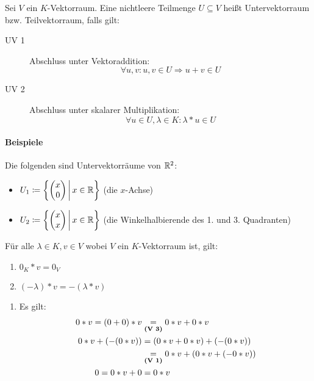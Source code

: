Sei $V$ ein $K$-Vektorraum. Eine nichtleere Teilmenge $U\subseteq V$ heißt Untervektorraum bzw. Teilvektorraum, falls gilt:
\begin{description}
  \item[UV 1] Abschluss unter Vektoraddition:
  \begin{equation*}
    \forall u,v : u,v \in U \Rightarrow u+v\in U
  \end{equation*}
  \item[UV 2] Abschluss unter skalarer Multiplikation:
  \begin{equation*}
    \forall u\in U, \lambda\in K : \lambda* u \in U
  \end{equation*}
\end{description}

\paragraph{Beispiele}
Die folgenden sind Untervektorräume von $\mathbb{R}^2$:
\begin{itemize}
  \item $U_1\coloneqq \left\{ \begin{pmatrix}x\\0\end{pmatrix} \,\middle|\, x\in\mathbb{R} \right\}$ (die $x$-Achse)
  \item $U_2\coloneqq \left\{ \begin{pmatrix}x\\x\end{pmatrix} \,\middle|\, x\in\mathbb{R} \right\}$ (die Winkelhalbierende des 1. und 3. Quadranten)
\end{itemize}


\begin{lemma}{}
  Für alle $\lambda \in K, v\in V$ wobei $V$ ein $K$-Vektorraum ist, gilt:
  \begin{enumerate}
    \item $0_K* v = 0_V$
    \item $(-\lambda)* v = -(\lambda* v)$
  \end{enumerate}
\end{lemma}
\beweis
\begin{enumerate}
  \item Es gilt:
  \begin{align*}
    0* v = (0+0)* v &\underset{\text{\textbf{(V 3)}}}{=}0* v+ 0* v\\
    0* v + (-(0* v)) &=(0* v + 0* v)+(-(0*v))\\
    &\underset{\text{\textbf{(V 1)}}}{=} 0*v+(0*v+(-0*v))\\
    0=0*v +0&=0*v
  \end{align*}
\end{enumerate}

